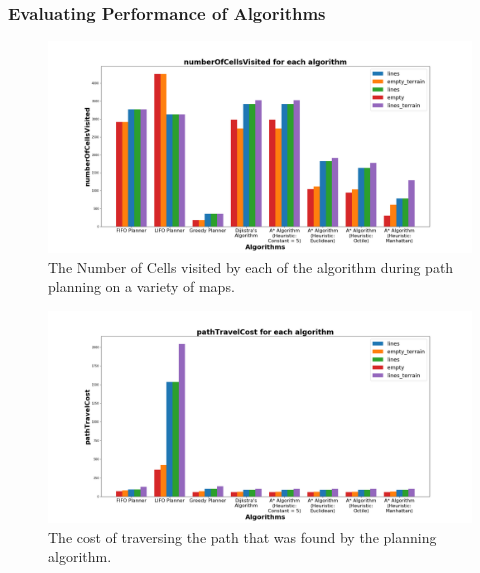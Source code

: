 \documentclass[a4paper,12pt]{article}
\begin{document}
			\subsubsection{Evaluating Performance of Algorithms}
			
				\begin{figure}[H]
					\renewcommand\thefigure{1.2}
					\centering
					
					\includegraphics[scale=0.3]{"images/numberOfCellsVisited for each algorithm.png"}
					\caption{The Number of Cells visited by each of the algorithm during path planning on a variety of maps.}
				\end{figure}
			
				\begin{figure}[H]
					\renewcommand\thefigure{1.3}
					\centering
					
					\includegraphics[scale=0.3]{"images/pathTravelCost for each algorithm.png"}
					\caption{The cost of traversing the path that was found by the planning algorithm.}
				\end{figure}
			
\end{document}
